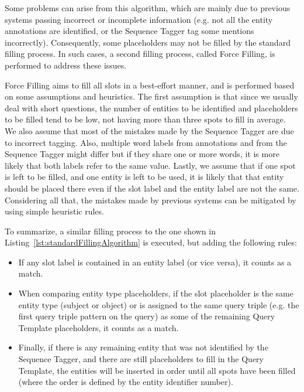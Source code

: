Some problems can arise from this algorithm, which are mainly due to previous systems passing 
incorrect or incomplete information (e.g. not all the entity annotations are identified, or 
the Sequence Tagger tag some mentions incorrectly). Consequently, some placeholders may not 
be filled by the standard filling process. In such cases, a second filling process, called 
Force Filling, is performed to address these issues.

Force Filling aims to fill all slots in a best-effort manner, and is performed based on some 
assumptions and heuristics. The first assumption is that since we usually deal with short 
questions, the number of entities to be identified and placeholders to be filled tend to be 
low, not having more than three spots to fill in average. We also assume that most of the 
mistakes made by the Sequence Tagger are due to incorrect tagging. Also, multiple word labels 
from annotations and from the Sequence Tagger might differ but if they share one or more 
words, it is more likely that both labels refer to the same value. Lastly, we assume that if 
one spot is left to be filled, and one entity is left to be used, it is likely that that 
entity should be placed there even if the slot label and the entity label are not the same. 
Considering all that, the mistakes made by previous systems can be mitigated by using simple 
heuristic rules. 

To summarize, a similar filling process to the one shown in Listing~\ref{lst:standardFillingAlgorithm} 
is executed, but adding the following rules:
\begin{itemize}
    \item If any slot label is contained in an entity label (or vice versa), it counts as a 
    match.
    \item When comparing entity type placeholders, if the slot placeholder is the same entity 
    type (subject or object) or is assigned to the same query triple (e.g. the first query 
    triple pattern on the \SPARQL{} query) as some of the remaining Query Template placeholders, 
    it counts as a match.
    \item Finally, if there is any remaining entity that was not identified by the Sequence 
    Tagger, and there are still placeholders to fill in the Query Template, the entities will 
    be inserted in order until all spots have been filled (where the order is defined by the 
    entity identifier number).
\end{itemize}

